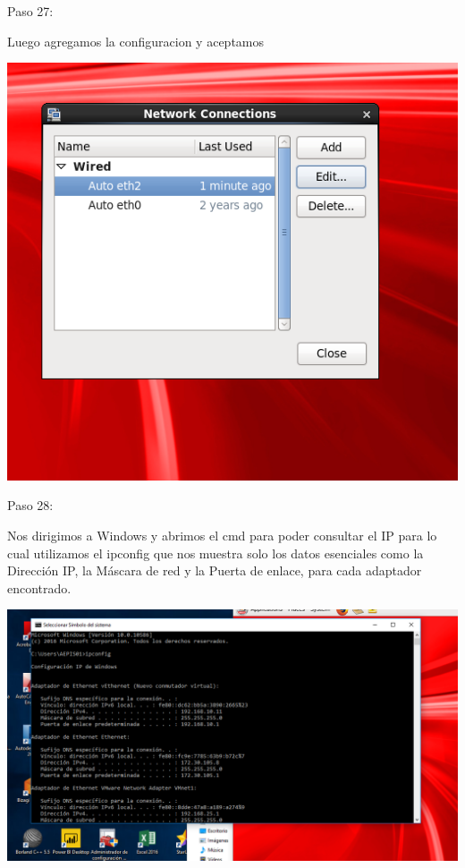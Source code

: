 \begin{itemize}
\begin{center}
    Paso 27:
\end{center}

    Luego agregamos la configuracion y aceptamos\\
	\begin{center}
	\includegraphics[width=15cm]{./Imagenes/imagen27} 
	\end{center}

\end{itemize} 

\begin{itemize}
\begin{center}
    Paso 28:
\end{center}

    Nos dirigimos a Windows y abrimos el cmd para poder consultar el IP para lo cual utilizamos el ipconfig que nos muestra solo los datos esenciales como la Dirección IP, la Máscara de red y la Puerta de enlace, para cada adaptador encontrado.\\
	\begin{center}
	\includegraphics[width=15cm]{./Imagenes/imagen28} 
	\end{center}

\end{itemize} 

